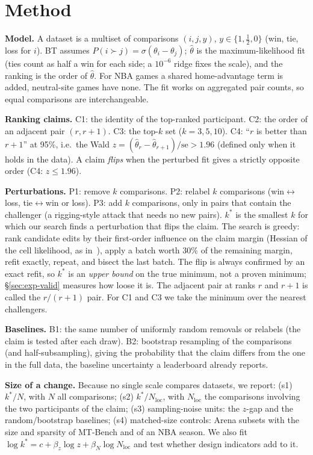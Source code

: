 \documentclass{article}
\newcommand{\kst}{k^{\ast}}
\begin{document}
\section{Method}
\label{sec:method}
\textbf{Model.} A dataset is a multiset of comparisons $(i,j,y)$, $y\in\{1,\tfrac12,0\}$ (win, tie, loss for $i$). BT assumes $P(i\succ j)=\sigma(\theta_i-\theta_j)$; $\hat\theta$ is the maximum-likelihood fit (ties count as half a win for each side; a $10^{-6}$ ridge fixes the scale), and the ranking is the order of $\hat\theta$. For NBA games a shared home-advantage term is added, neutral-site games have none. The fit works on aggregated pair counts, so equal comparisons are interchangeable.

\textbf{Ranking claims.} C1: the identity of the top-ranked participant. C2: the order of an adjacent pair $(r,r{+}1)$. C3: the top-$k$ set ($k=3,5,10$). C4: ``$r$ is better than $r{+}1$'' at 95\%, i.e.\ the Wald $z=(\hat\theta_r-\hat\theta_{r+1})/\mathrm{se}>1.96$ (defined only when it holds in the data). A claim \emph{flips} when the perturbed fit gives a strictly opposite order (C4: $z\le1.96$).

\textbf{Perturbations.} P1: remove $k$ comparisons. P2: relabel $k$ comparisons (win$\leftrightarrow$loss, tie$\leftrightarrow$win or loss). P3: add $k$ comparisons, only in pairs that contain the challenger (a rigging-style attack that needs no new pairs). $\kst$ is the smallest $k$ for which our search finds a perturbation that flips the claim. The search is greedy: rank candidate edits by their first-order influence on the claim margin (Hessian of the cell likelihood, as in~\cite{koh2017understanding,broderick2020automatic}), apply a batch worth 30\% of the remaining margin, refit exactly, repeat, and bisect the last batch. The flip is always confirmed by an exact refit, so $\kst$ is an \emph{upper bound} on the true minimum, not a proven minimum; \S\ref{sec:exp-valid} measures how loose it is. The adjacent pair at ranks $r$ and $r{+}1$ is called the $r/(r{+}1)$ pair. For C1 and C3 we take the minimum over the nearest challengers.

\textbf{Baselines.} B1: the same number of uniformly random removals or relabels (the claim is tested after each draw). B2: bootstrap resampling of the comparisons (and half-subsampling), giving the probability that the claim differs from the one in the full data, the baseline uncertainty a leaderboard already reports.

\textbf{Size of a change.} Because no single scale compares datasets, we report: (s1) $\kst/N$, with $N$ all comparisons; (s2) $\kst/N_{\mathrm{loc}}$, with $N_{\mathrm{loc}}$ the comparisons involving the two participants of the claim; (s3) sampling-noise units: the $z$-gap and the random/bootstrap baselines; (s4) matched-size controls: Arena subsets with the size and sparsity of MT-Bench and of an NBA season. We also fit $\log\kst=c+\beta_z\log z+\beta_N\log N_{\mathrm{loc}}$ and test whether design indicators add to it.
\end{document}
